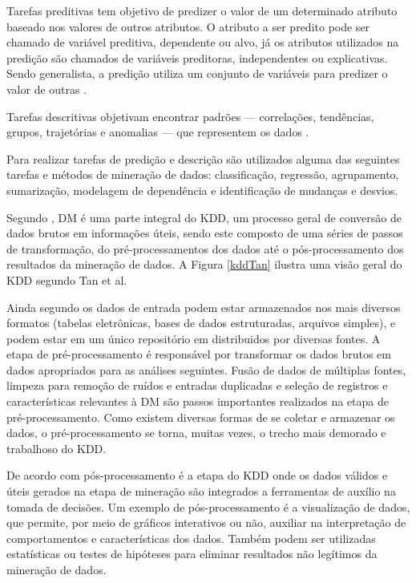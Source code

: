 Tarefas preditivas tem objetivo de predizer o valor de um determinado atributo
baseado nos valores de outros atributos. O atributo a ser predito pode ser
chamado de variável preditiva, dependente ou alvo, já os atributos utilizados na
predição são chamados de variáveis preditoras, independentes ou explicativas.
Sendo generalista, a predição utiliza um conjunto de variáveis para predizer o
valor de outras \cite{fayyad1996data}.

Tarefas descritivas objetivam encontrar padrões --- correlações, tendências,
grupos, trajetórias e anomalias --- que representem os dados
\cite{fayyad1996data}.

Para realizar tarefas de predição e descrição são utilizados alguma das
seguintes tarefas e métodos de mineração de dados: classificação, regressão,
agrupamento, sumarização, modelagem de dependência e identificação de mudanças e
desvios.

Segundo , DM é uma parte integral do KDD, um
processo geral de conversão de dados brutos em informações úteis, sendo este
composto de uma séries de passos de transformação, do pré-processamentos dos
dados até o pós-processamento dos resultados da mineração de dados. A Figura
\ref{kddTan} ilustra uma visão geral do KDD segundo Tan et al.


Ainda segundo  os dados de entrada podem estar
armazenados nos mais diversos formatos (tabelas eletrônicas, bases de dados
estruturadas, arquivos simples), e podem estar em um único repositório em
distribuidos por diversas fontes. A etapa de pré-processamento é responsável por
transformar os dados brutos em dados apropriados para as análises seguintes.
Fusão de dados de múltiplas fontes, limpeza para remoção de ruídos e entradas
duplicadas e seleção de registros e características relevantes à DM são passos
importantes realizados na etapa de pré-processamento. Como existem diversas
formas de se coletar e armazenar os dados, o pré-processamento se torna, muitas
vezes, o trecho mais demorado e trabalhoso do KDD.

De acordo com  pós-processamento é a etapa do KDD
onde os dados válidos e úteis gerados na etapa de mineração são integrados a
ferramentas de auxílio na tomada de decisões. Um exemplo de pós-processamento é
a visualização de dados, que permite, por meio de gráficos interativos ou não,
auxiliar na interpretação de comportamentos e características dos dados. Também
podem ser utilizadas estatísticas ou testes de hipóteses para eliminar
resultados não legítimos da mineração de dados.

